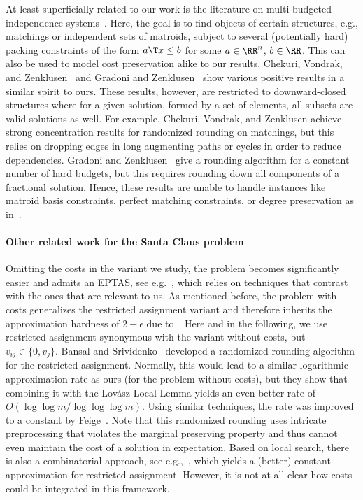 At least superficially related to our work is the literature on multi-budgeted
independence systems~\cite{ChekuriVZ11, GrandoniZ10}.
Here, the goal is to find objects of certain structures, e.g.,
matchings or independent sets of matroids,
subject to several (potentially hard) packing constraints
of the form
$a\T x\le b$ for some $a\in \RR^n$, $b\in \RR$.
This can also be used to model cost preservation alike to our
results.
Chekuri, Vondrak, and Zenklusen~\cite{ChekuriVZ11}
and Gradoni and Zenklusen~\cite{GrandoniZ10}
show various positive results in a similar spirit to ours.
These results, however, are restricted to downward-closed structures where for a given solution, formed by a
set of elements, all subsets are valid solutions as well.
For example, Chekuri, Vondrak, and Zenklusen achieve
strong concentration results for randomized rounding on matchings, but this relies on dropping edges in long augmenting paths or cycles in order to reduce dependencies.
Gradoni and Zenklusen~\cite{GrandoniZ10} give a rounding algorithm for a constant number of hard budgets, but
this requires rounding down all components of a fractional solution.
Hence, these results are unable to handle instances like matroid basis constraints, perfect matching constraints, or degree preservation as in~.


\paragraph*{Other related work for the Santa Claus problem}
Omitting the costs in the variant we study, the problem
becomes significantly easier and admits an EPTAS, see e.g.~\cite{JansenKV20}, which relies on techniques that contrast with the ones that are relevant to us.
As mentioned before, the problem with costs generalizes
the restricted assignment variant and therefore
inherits the approximation hardness of $2-\epsilon$ due to~\cite{BansalS06}.
Here and in the following, we use restricted assignment synonymous
with the variant without costs, but $v_{ij}\in \{0, v_j\}$.
Bansal and Srividenko~\cite{BansalS06} developed a randomized rounding algorithm for the restricted assignment.
Normally, this would lead
to a similar logarithmic approximation rate as ours
(for the problem without costs),
but they show that combining it
with the Lov\'asz Local Lemma yields an even better rate of
$O(\log\log m/ \log\log\log m)$.
Using similar techniques, the rate was improved to a constant by Feige~\cite{Feige08}.
Note that this randomized rounding uses intricate preprocessing
that violates the marginal preserving property and thus cannot even
maintain the cost of a solution in expectation.
Based on local search, there is also a combinatorial approach, 
see e.g.,~\cite{BamasLMRS24, AsadpourFS08, AnnamalaiKS17},
which yields a (better) constant approximation for restricted
assignment. However, it is not at all clear how costs could be
integrated in this framework.

